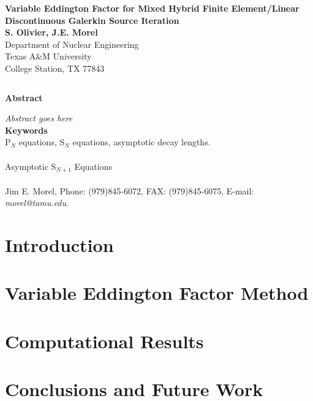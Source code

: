 \documentclass[12pt]{article}
\date{}
\newcommand{\bc}{\begin{center}}
\newcommand{\ec}{\end{center}}
\newcommand{\ess}{\doublespacing}
\begin{document}
%

\thispagestyle{empty}
\bc
{\Large \bf Variable Eddington Factor for Mixed Hybrid Finite Element/Linear Discontinuous Galerkin Source Iteration}\\
\vspace{0.5in}
{\large {\bf S. Olivier, J.E. Morel}\\
$ $\\
Department of Nuclear Engineering\\
Texas A\&M University\\
College Station, TX 77843}\\
\ec
$ $\\
\bc
{\large \bf Abstract}\\
\ec
\noindent
\emph{
Abstract goes here
}\\
$ $\\
\noindent
{\bf Keywords}\\
\noindent P$_N$ equations, S$_N$ equations, asymptotic decay lengths.\\
$ $\\
\\
\noindent Asymptotic S$_{N+1}$ Equations\\
$ $\\
\\
\noindent Jim E. Morel, Phone: (979)845-6072, FAX: (979)845-6075, E-mail: \emph{morel@tamu.edu}.
$ $\\
\newpage
\ess

\section{Introduction}


\section{Variable Eddington Factor Method}
% 
% 


\section{Computational Results}


\section{Conclusions and Future Work}
\end{document}
